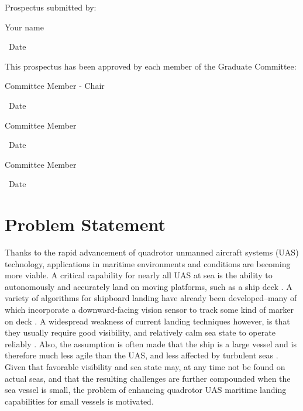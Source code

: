\documentclass[12pt, letterpaper]{article}
\begin{document}
\hspace*{.47in}
\begin{minipage}[c]{5.25in}

\normalsize

Prospectus submitted by:

\vspace{.5in}

\makebox[2in]{\hrulefill} \hspace{1in} \makebox[2in]{\hrulefill}

\parbox[b]{3in}{Your name} \, Date
\vspace{0.5in}

This prospectus has been approved by each member of the Graduate Committee:
\vspace{0.5in}

\makebox[2in]{\hrulefill} \hspace{1in} \makebox[2in]{\hrulefill}

\parbox[b]{3in}{Committee Member - Chair} \, Date
\vspace{0.4in}

\makebox[2in]{\hrulefill} \hspace{1in} \makebox[2in]{\hrulefill}

\parbox[b]{3in}{Committee Member} \, Date
\vspace{0.4in}

\makebox[2in]{\hrulefill} \hspace{1in} \makebox[2in]{\hrulefill}

\parbox[b]{3in}{Committee Member} \, Date

\end{minipage}

\vspace*{\fill}

\pagebreak

\setcounter{page}{1}

\section{Problem Statement}

Thanks to the rapid advancement of quadrotor unmanned aircraft systems (UAS) technology, applications in maritime environments and conditions are becoming more viable.  A critical capability for nearly all UAS at sea is the ability to autonomously and accurately land on moving platforms, such as a ship deck \cite{Herisse2012}.  A variety of algorithms for shipboard landing have already been developed--many of which incorporate a downward-facing vision sensor to track some kind of marker on deck \cite{Truskin2013} \cite{Kong2014}.  A widespread weakness of current landing techniques however, is that they usually require good visibility, and relatively calm sea state to operate reliably \cite{Tan2016}. Also, the assumption is often made that the ship is a large vessel and is therefore much less agile than the UAS, and less affected by turbulent seas \cite{Ling2014}.  Given that favorable visibility and sea state may, at any time not be found on actual seas, and that the resulting challenges are further compounded when the sea vessel is small, the problem of enhancing quadrotor UAS maritime landing capabilities for small vessels is motivated.  
\end{document}
